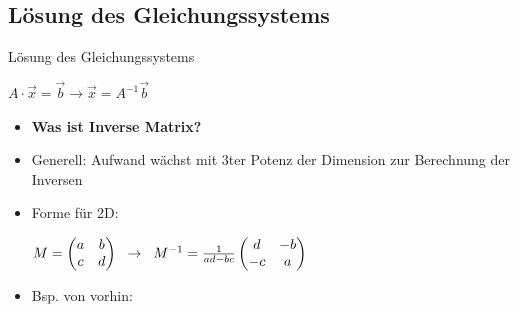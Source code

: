 \documentclass[10pt,aspectratio=169]{beamer}
\begin{document}
  \subsection{Lösung des Gleichungssystems}
  \begin{frame}{Lösung des Gleichungssystems}
    \begin{center}
      $A \cdot \vec{x} = \vec{b} \rightarrow \vec{x} = A^{-1}\vec{b}$
    \end{center}
    \begin{itemize}
      \item \textbf{Was ist Inverse Matrix?}
      \item Generell: Aufwand wächst mit 3ter Potenz der Dimension zur Berechnung der Inversen
      \item Forme für 2D:\\
      \begin{center}
        $M= \begin{pmatrix}
          a & b\\
          c & d\\
        \end{pmatrix}\hspace{0.2cm} \rightarrow \hspace{0.2cm}
        M^{-1} = \frac{1}{ad - bc}
        \begin{pmatrix}
          d & -b\\
          -c & a
        \end{pmatrix}$
      \end{center}
      \item Bsp. von vorhin:
      

\end{itemize}
\end{frame}
\end{document}

